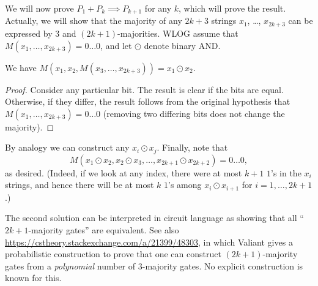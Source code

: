 \documentclass[11pt]{scrartcl}
\begin{document}
We will now prove $P_1 + P_k \implies P_{k+1}$ for any $k$,
which will prove the result.
Actually, we will show that the majority
of any $2k+3$ strings $x_1$, \dots, $x_{2k+3}$
can be expressed by $3$ and $(2k+1)$-majorities.
WLOG assume that $M(x_1, \dots, x_{2k+3}) = 0\dots0$,
and let $\odot$ denote binary AND.
\begin{claim*}
  We have $M(x_1, x_2, M(x_3, \dots, x_{2k+3})) = x_1 \odot x_2$.
\end{claim*}
\begin{proof}
  Consider any particular bit.
  The result is clear if the bits are equal.
  Otherwise, if they differ,
  the result follows from the original hypothesis that
  $M(x_1, \dots, x_{2k+3}) = 0\dots0$
  (removing two differing bits does not change the majority).
\end{proof}
By analogy we can construct any $x_i \odot x_j$.
Finally, note that
\[ M(x_1 \odot x_2, x_2 \odot x_3, \dots,
  x_{2k+1} \odot x_{2k+2}) = 0\dots0, \]
as desired. (Indeed, if we look at any index,
there were at most $k+1$ $1$'s in the $x_i$ strings,
and hence there will be at most $k$ $1$'s among
$x_i \odot x_{i+1}$ for $i=1,\dots,2k+1$.)

\begin{remark*}
  The second solution can be interpreted in circuit language
  as showing that all ``$2k+1$-majority gates'' are equivalent.
  See also \url{https://cstheory.stackexchange.com/a/21399/48303},
  in which Valiant gives a probabilistic construction to prove
  that one can construct $(2k+1)$-majority gates from a
  \emph{polynomial} number of $3$-majority gates.
  No explicit construction is known for this.
\end{remark*}
\pagebreak
\end{document}
